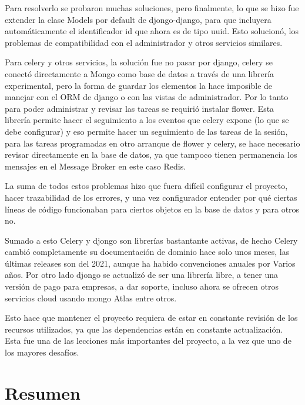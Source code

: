     \par Para resolverlo se probaron muchas soluciones, pero finalmente, lo que se hizo fue extender la clase Models por default de djongo-django, para que incluyera automáticamente el identificador id que ahora es de tipo uuid. Esto solucionó, los problemas de compatibilidad con el administrador y otros servicios similares.
    \par Para celery y otros servicios, la solución fue no pasar por django, celery se conectó directamente a Mongo como base de datos a través de una librería experimental, pero la forma de guardar los elementos la hace imposible de manejar con el ORM de django o con las vistas de administrador. Por lo tanto para poder administrar y revisar las tareas se requirió instalar flower. Esta librería permite hacer el seguimiento a los eventos que celery expone (lo que se debe configurar) y eso permite hacer un seguimiento de las tareas de la sesión, para las tareas programadas en otro arranque de flower y celery, se hace necesario revisar directamente en la base de datos, ya que tampoco tienen permanencia los mensajes en el Message Broker en este caso Redis.
    \par La suma de todos estos problemas hizo que fuera difícil configurar el proyecto, hacer trazabilidad de los errores, y una vez configurador entender por qué ciertas líneas de código funcionaban para ciertos objetos en la base de datos y para otros no.
    \par Sumado a esto Celery y djongo son librerías bastantante activas, de hecho Celery cambió completamente su documentación de dominio hace solo unos meses, las últimas releases son del 2021, aunque ha habido convenciones anuales por Varios años. Por otro lado djongo se actualizó de ser una librería libre, a tener una versión de pago para empresas, a dar soporte, incluso ahora se ofrecen otros servicios cloud usando mongo Atlas entre otros.
    \par Esto hace que mantener el proyecto requiera de estar en constante revisión de los recursos utilizados, ya que las dependencias están en constante actualización. Esta fue una de las lecciones más importantes del proyecto, a la vez que uno de los mayores desafíos.

\section{Resumen}

